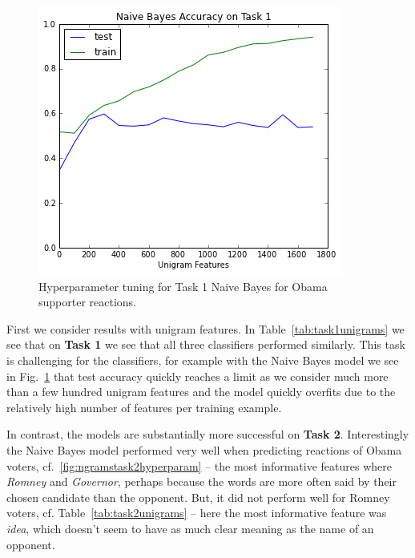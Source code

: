 \begin{figure}[]
	\centering
	\includegraphics[scale=0.55]{Figures/ngrams_hyperparam_task1.png}
	\caption{Hyperparameter tuning for Task 1 Naive Bayes for Obama supporter reactions.}
	\label{fig:ngramstask1hyperparam}
\end{figure}

First we consider results with unigram features. In Table~\ref{tab:task1unigrams} we see that on \textbf{Task 1} we see that all three classifiers performed similarly.  This task is challenging for the classifiers, for example with the Naive Bayes model we see in Fig.~\ref{fig:ngramstask1hyperparam} that test accuracy quickly reaches a limit as we consider much more than a few hundred unigram features and the model quickly overfits due to the relatively high number of features per training example.

In contrast, the models are substantially more successful on \textbf{Task 2}.  Interestingly the Naive Bayes model performed very well when predicting reactions of Obama voters, cf.~\ref{fig:ngramstask2hyperparam} -- the most informative features where \emph{Romney} and \emph{Governor}, perhaps because the words are more often said by their chosen candidate than the opponent.  But, it did not perform well for Romney voters, cf. Table~\ref{tab:task2unigrams} -- here the most informative feature was \emph{idea}, which doesn't seem to have as much clear meaning as the name of an opponent. 

